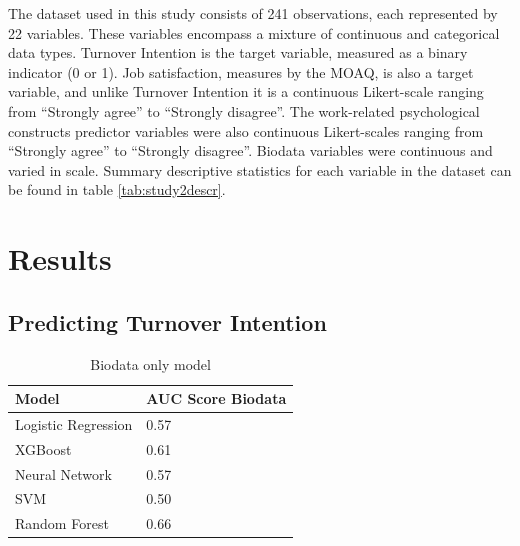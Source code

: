 \documentclass[
  man]{apa7}
\begin{document}
The dataset used in this study consists of 241 observations, each represented by 22 variables. These variables encompass a mixture of continuous and categorical data types. Turnover Intention is the target variable, measured as a binary indicator (0 or 1). Job satisfaction, measures by the MOAQ, is also a target variable, and unlike Turnover Intention it is a continuous Likert-scale ranging from ``Strongly agree'' to ``Strongly disagree''. The work-related psychological constructs predictor variables were also continuous Likert-scales ranging from ``Strongly agree'' to ``Strongly disagree''. Biodata variables were continuous and varied in scale. Summary descriptive statistics for each variable in the dataset can be found in table \ref{tab:study2descr}.

\hypertarget{results-1}{%
\section{Results}\label{results-1}}

\hypertarget{predicting-turnover-intention}{%
\subsection{Predicting Turnover Intention}\label{predicting-turnover-intention}}

\begin{table}[tbp]

\begin{center}
\begin{threeparttable}

\caption{\label{tab:biotable}Biodata only model}

\begin{tabular}{ll}
\toprule
Model & \multicolumn{1}{c}{AUC Score Biodata}\\
\midrule
Logistic Regression & 0.57\\
XGBoost & 0.61\\
Neural Network & 0.57\\
SVM & 0.50\\
Random Forest & 0.66\\
\bottomrule
\end{tabular}

\end{threeparttable}
\end{center}

\end{table}
\end{document}
